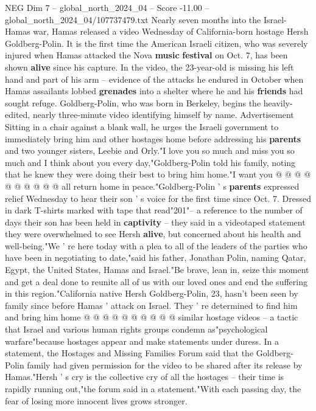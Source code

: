 \begin{textsample}{NEG Dim 7 – global\_north\_2024\_04 – Score -11.00 – global\_north\_2024\_04/107737479.txt}  \label{ex:f7_neg_221}
Nearly seven months into the Israel-Hamas war, Hamas released a video Wednesday of California-born hostage Hersh Goldberg-Polin.
It is the first time the American Israeli citizen, who was severely injured when Hamas attacked the Nova \textbf{music} \textbf{festival} on Oct. 7, has been shown \textbf{alive} since his capture.
In the video, the 23-year-old is missing his left hand and part of his arm -- evidence of the attacks he endured in October when Hamas assailants lobbed \textbf{grenades} into a shelter where he and his \textbf{friends} had sought refuge.
Goldberg-Polin, who was born in Berkeley, begins the heavily-edited, nearly three-minute video identifying himself by name.
Advertisement Sitting in a chair against a blank wall, he urges the Israeli government to immediately bring him and other hostages home before addressing his \textbf{parents} and two younger sisters, Leebie and Orly."I love you so much and miss you so much and I think about you every day,"Goldberg-Polin told his family, noting that he knew they were doing their best to bring him home."I want you @ @ @ @ @ @ @ @ @ @ all return home in peace."Goldberg-Polin ' s \textbf{parents} expressed relief Wednesday to hear their son ' s voice for the first time since Oct. 7.
Dressed in dark T-shirts marked with tape that read"201"-- a reference to the number of days their son has been held in \textbf{captivity} -- they said in a videotaped statement they were overwhelmed to see Hersh \textbf{alive}, but concerned about his health and well-being."We ' re here today with a plea to all of the leaders of the parties who have been in negotiating to date,"said his father, Jonathan Polin, naming Qatar, Egypt, the United States, Hamas and Israel."Be brave, lean in, seize this moment and get a deal done to reunite all of us with our loved ones and end the suffering in this region."California native Hersh Goldberg-Polin, 23, hasn't been seen by family since before Hamas ' attack on Israel.
They ' re determined to find him and bring him home @ @ @ @ @ @ @ @ @ @ similar hostage videos -- a tactic that Israel and various human rights groups condemn as"psychological warfare"because hostages appear and make statements under duress.
In a statement, the Hostages and Missing Families Forum said that the Goldberg-Polin family had given permission for the video to be shared after its release by Hamas."Hersh ' s cry is the collective cry of all the hostages -- their time is rapidly running out,"the forum said in a statement."With each passing day, the fear of losing more innocent lives grows stronger.

\end{textsample}
